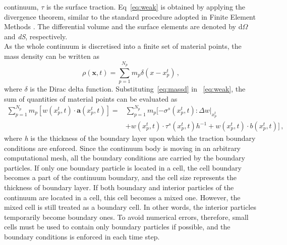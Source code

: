 continuum, $\tau$ is the surface traction. Eq~\ref{eq:weak} is obtained by 
applying the divergence theorem, similar to the standard procedure adopted in 
Finite 
Element Methods \citep{Sulsky1994,Sulsky1995, Chen2002}. The differential 
volume and the surface elements are denoted by d$\Omega$ and \textit{dS}, 
respectively. \\
As the whole continuum is discretised into a finite set of material points, the 
mass density can be written as
\begin{equation}
\rho(\mathbf{x},t)=\sum\limits_{\mathit{p}=1}^{\mathit{N}_{p}}
{\mathit{m}_{p}\delta(\mathbf{\mathit{x}}-\mathbf{\mathit{x}}_{p}^{t})} \,,
\label{eq:massd}
\end{equation}
where $\delta$ is the Dirac delta function. Substituting~\cref{eq:massd} in 
~\cref{eq:weak}, the sum of quantities of material points can be evaluated 
as
\begin{align}
\nonumber
\sum\limits_{\mathit{p}=1}^{\mathit{N}_{p}} 
\mathit{m}_{p}[\mathbf{\mathit{w}}(\mathit{x}_{p}^{t},t) \cdot 
\mathbf{a}(\mathit{x}_{p}^{t},t)] = & 
\sum\limits_{\mathit{p}=1}^{\mathit{N}_{p}} \mathit{m}_{p} 
[-\sigma^{s}(\mathit{x}_{p}^{t},t): \Delta 
\mathbf{\mathit{w}}|_{\mathit{x}_{p}^{t}} \\ 
& + \mathbf{\mathit{w}}(\mathit{x}_{p}^{t},t) \cdot 
\tau^{s}(\mathit{x}_{p}^{t},t)h^{-1} +  
\mathbf{\mathit{w}}(\mathit{x}_{p}^{t},t) \cdot 
\mathbf{\mathit{b}}(\mathit{x}_{p}^{t},t)] \,,
\label{eq:MPM}
\end{align}
where \textit{h} is the thickness of the boundary layer upon which the traction 
boundary conditions are enforced. Since the continuum body is moving in an 
arbitrary computational mesh, all the boundary conditions are carried by the 
boundary particles. If only one boundary particle is located in a cell, the 
cell boundary becomes a part of the continuum boundary, and the cell size 
represents the thickness of boundary layer. If both boundary and interior
particles of the continuum are located in a cell, this cell becomes a mixed 
one. However, the mixed cell is still treated as a boundary cell. In other 
words, the interior particles temporarily become boundary ones. To avoid
numerical errors, therefore, small cells must be used to contain only boundary 
particles if possible, and the boundary conditions is enforced in each 
time step.

